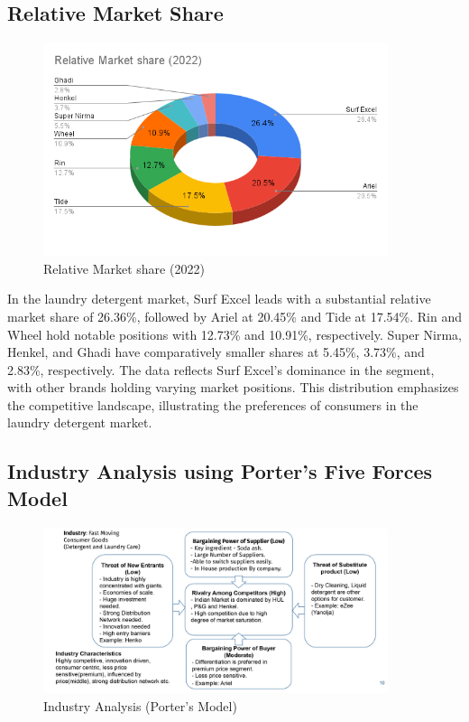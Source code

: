 \subsection{Relative Market Share}
\begin{figure}[h]
    \centering
    \includegraphics[width=0.9\textwidth]{images/Relative Market share (2022).png}
    \caption{Relative Market share (2022)}
    \label{fig:BCG Matrix}
  \end{figure}
In the laundry detergent market, Surf Excel leads with a substantial relative market share of 26.36\%, followed by Ariel at 20.45\% and Tide at 17.54\%. Rin and Wheel hold notable positions with 12.73\% and 10.91\%, respectively. Super Nirma, Henkel, and Ghadi have comparatively smaller shares at 5.45\%, 3.73\%, and 2.83\%, respectively. The data reflects Surf Excel's dominance in the segment, with other brands holding varying market positions. This distribution emphasizes the competitive landscape, illustrating the preferences of consumers in the laundry detergent market.

\subsection{Industry Analysis using Porter's Five Forces Model}
\begin{figure}[H]
    \centering
    \includegraphics[width=0.9\textwidth]{images/Porters Model.jpg}
    \caption{Industry Analysis (Porter’s Model)}
    \label{fig:BCG Matrix}
  \end{figure}
